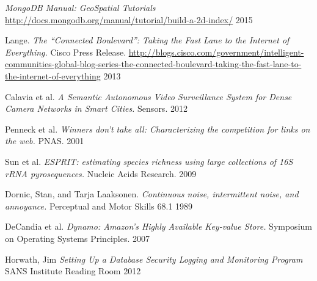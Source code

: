 \documentclass[11pt]{article}
\begin{document}
\begin{thebibliography}{99}
  \emph{MongoDB Manual: GeoSpatial Tutorials}
  \url{http://docs.mongodb.org/manual/tutorial/build-a-2d-index/}
  2015

  Lange.
  \emph{The ``Connected Boulevard'': Taking the Fast Lane to the Internet of Everything.}
  Cisco Press Release.
  \url{http://blogs.cisco.com/government/intelligent-communities-global-blog-series-the-connected-boulevard-taking-the-fast-lane-to-the-internet-of-everything}
  2013

  Calavia et al.
  \emph{A Semantic Autonomous Video Surveillance System for Dense Camera Networks in Smart Cities.}
  Sensors.
  2012

  Penneck et al.
  \emph{Winners don't take all: Characterizing the competition for links on the web.}
  PNAS.
  2001

  Sun et al.
  \emph{ESPRIT: estimating species richness using large collections of 16S rRNA pyrosequences.}
  Nucleic Acids Research.
  2009

Dornic, Stan, and Tarja Laaksonen. 
\emph{Continuous noise, intermittent noise, and annoyance.} 
Perceptual and Motor Skills 68.1
1989

  DeCandia et al.
  \emph{Dynamo: Amazon’s Highly Available Key-value Store.}
  Symposium on Operating Systems Principles.
  2007

Horwath, Jim
\emph{Setting Up a Database Security Logging and Monitoring Program}
SANS Institute Reading Room
2012

\end{thebibliography}
\end{document}
